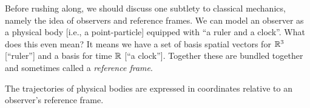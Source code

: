 Before rushing along, we should discuss one subtlety to classical
mechanics, namely the idea of observers and reference frames. We can
model an observer as a physical body [i.e., a point-particle] equipped
with ``a ruler and a clock''. What does this even mean? It means we have
a set of basis spatial vectors for $\mathbb{R}^{3}$ [``ruler''] and a basis for
time $\mathbb{R}$ [``a clock'']. Together these are bundled together and
sometimes called a \emph{reference frame}.

The trajectories of physical bodies are expressed in coordinates
relative to an observer's reference frame.
